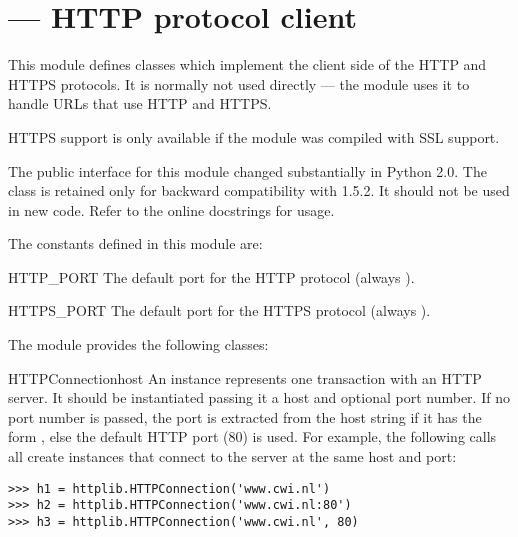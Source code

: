\section{ ---
         HTTP protocol client}



This module defines classes which implement the client side of the
HTTP and HTTPS protocols.  It is normally not used directly --- the
module  uses it to handle URLs
that use HTTP and HTTPS.

\begin{notice}
  HTTPS support is only available if the  module was
  compiled with SSL support.
\end{notice}

\begin{notice}
  The public interface for this module changed substantially in Python
  2.0.  The  class is retained only for backward
  compatibility with 1.5.2.  It should not be used in new code.  Refer
  to the online docstrings for usage.
\end{notice}

The constants defined in this module are:

\begin{datadesc}{HTTP_PORT}
  The default port for the HTTP protocol (always ).
\end{datadesc}

\begin{datadesc}{HTTPS_PORT}
  The default port for the HTTPS protocol (always ).
\end{datadesc}

The module provides the following classes:

\begin{classdesc}{HTTPConnection}{host}
An  instance represents one transaction with an HTTP
server.  It should be instantiated passing it a host and optional port number.
If no port number is passed, the port is extracted from the host string if it
has the form , else the default HTTP port (80) is
used.  For example, the following calls all create instances that connect to
the server at the same host and port:

\begin{verbatim}
>>> h1 = httplib.HTTPConnection('www.cwi.nl')
>>> h2 = httplib.HTTPConnection('www.cwi.nl:80')
>>> h3 = httplib.HTTPConnection('www.cwi.nl', 80)
\end{verbatim}
\end{classdesc}

